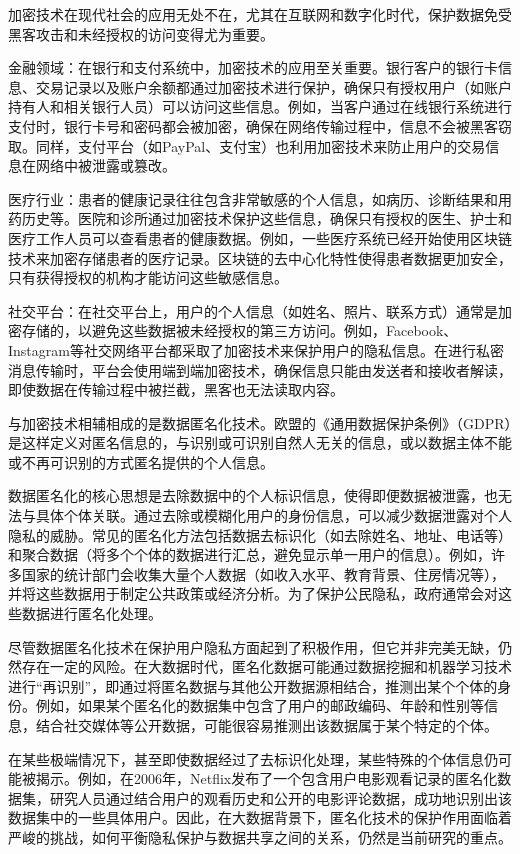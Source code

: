 加密技术在现代社会的应用无处不在，尤其在互联网和数字化时代，保护数据免受黑客攻击和未经授权的访问变得尤为重要。

金融领域：在银行和支付系统中，加密技术的应用至关重要。银行客户的银行卡信息、交易记录以及账户余额都通过加密技术进行保护，确保只有授权用户（如账户持有人和相关银行人员）可以访问这些信息。例如，当客户通过在线银行系统进行支付时，银行卡号和密码都会被加密，确保在网络传输过程中，信息不会被黑客窃取。同样，支付平台（如PayPal、支付宝）也利用加密技术来防止用户的交易信息在网络中被泄露或篡改。

医疗行业：患者的健康记录往往包含非常敏感的个人信息，如病历、诊断结果和用药历史等。医院和诊所通过加密技术保护这些信息，确保只有授权的医生、护士和医疗工作人员可以查看患者的健康数据。例如，一些医疗系统已经开始使用区块链技术来加密存储患者的医疗记录。区块链的去中心化特性使得患者数据更加安全，只有获得授权的机构才能访问这些敏感信息。

社交平台：在社交平台上，用户的个人信息（如姓名、照片、联系方式）通常是加密存储的，以避免这些数据被未经授权的第三方访问。例如，Facebook、Instagram等社交网络平台都采取了加密技术来保护用户的隐私信息。在进行私密消息传输时，平台会使用端到端加密技术，确保信息只能由发送者和接收者解读，即使数据在传输过程中被拦截，黑客也无法读取内容。

与加密技术相辅相成的是数据匿名化技术。欧盟的《通用数据保护条例》（GDPR）是这样定义对匿名信息的，与识别或可识别自然人无关的信息，或以数据主体不能或不再可识别的方式匿名提供的个人信息。

数据匿名化的核心思想是去除数据中的个人标识信息，使得即便数据被泄露，也无法与具体个体关联。通过去除或模糊化用户的身份信息，可以减少数据泄露对个人隐私的威胁。常见的匿名化方法包括数据去标识化（如去除姓名、地址、电话等）和聚合数据（将多个个体的数据进行汇总，避免显示单一用户的信息）。例如，许多国家的统计部门会收集大量个人数据（如收入水平、教育背景、住房情况等），并将这些数据用于制定公共政策或经济分析。为了保护公民隐私，政府通常会对这些数据进行匿名化处理。

尽管数据匿名化技术在保护用户隐私方面起到了积极作用，但它并非完美无缺，仍然存在一定的风险。在大数据时代，匿名化数据可能通过数据挖掘和机器学习技术进行“再识别”，即通过将匿名数据与其他公开数据源相结合，推测出某个个体的身份。例如，如果某个匿名化的数据集中包含了用户的邮政编码、年龄和性别等信息，结合社交媒体等公开数据，可能很容易推测出该数据属于某个特定的个体。

在某些极端情况下，甚至即使数据经过了去标识化处理，某些特殊的个体信息仍可能被揭示。例如，在2006年，Netflix发布了一个包含用户电影观看记录的匿名化数据集，研究人员通过结合用户的观看历史和公开的电影评论数据，成功地识别出该数据集中的一些具体用户。因此，在大数据背景下，匿名化技术的保护作用面临着严峻的挑战，如何平衡隐私保护与数据共享之间的关系，仍然是当前研究的重点。

